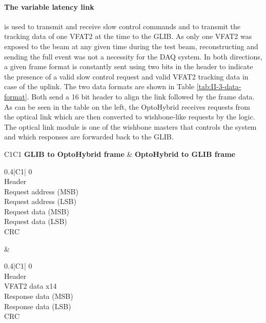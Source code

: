       \paragraph{The variable latency link} is used to transmit and receive slow control commands and to transmit the tracking data of one VFAT2 at the time to the GLIB. As only one VFAT2 was exposed to the beam at any given time during the test beam, reconstructing and sending the full event was not a necessity for the DAQ system. In both directions, a given frame format is constantly sent using two bits in the header to indicate the presence of a valid slow control request and valid VFAT2 tracking data in case of the uplink. The two data formats are shown in Table \ref{tab:II-3-data-format}. Both send a 16 bit header to align the link followed by the frame data. As can be seen in the table on the left, the OptoHybrid receives requests from the optical link which are then converted to wishbone-like requests by the logic. The optical link module is one of the wishbone masters that controls the system and which responses are forwarded back to the GLIB.

      \begin{table}
        \begin{tabularx}{\textwidth}{C{1}C{1}}
          \textbf{GLIB to OptoHybrid frame} & \textbf{OptoHybrid to GLIB frame} \\
          {
          \begin{tabularx}{0.4\textwidth}{|C{1}|}
             \hfill 0 \\ \hline
            Header \\ \hline
            Request address (MSB) \\ \hline
            Request address (LSB) \\ \hline
            Request data (MSB) \\ \hline
            Request data (LSB) \\ \hline
            CRC \\ \hline
          \end{tabularx} }
          &
          { \begin{tabularx}{0.4\textwidth}{|C{1}|}
             \hfill 0 \\ \hline
            Header \\ \hline
            VFAT2 data x14 \\ \hline
            Response data (MSB) \\ \hline
            Response data (LSB) \\ \hline
            CRC \\ \hline
          \end{tabularx} }
        \end{tabularx}
        \caption{??}
        \label{tab:II-3-data-format}
      \end{table}

